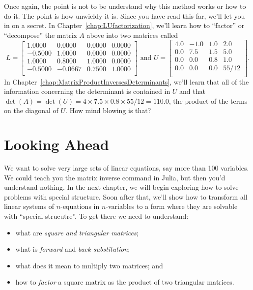 Once again, the point is not to be understand why this method works or how to do it. The point is how unwieldy it is. Since you have read this far, we'll let you in on a secret. In Chapter~\ref{chap:LUfactorization}, we'll learn how to ``factor'' or ``decompose'' the matrix $A$ above into two matrices called
$$ L =
\left[
\begin{array}{rrrr}
1.0000 & 0.0000 & 0.0000 & 0.0000 \\
-0.5000 & 1.0000 & 0.0000 & 0.0000 \\
1.0000 & 0.8000 & 1.0000 & 0.0000 \\
-0.5000 & -0.0667 & 0.7500 & 1.0000 \\
\end{array}
\right] \text{ and } U=\left[
\begin{array}{rrrc}
4.0 & -1.0 & 1.0 & 2.0 \\
0.0 & 7.5 & 1.5 & 5.0 \\
0.0 & 0.0 & 0.8 & 1.0 \\
0.0 & 0.0 & 0.0 & 55/12 \\
\end{array}
\right].
$$
In Chapter~\ref{chap:MatrixProductInversesDeterminants}, we'll learn that all of the information concerning the determinant is contained in $U$ and that $\det(A) = \det(U) = 4 \times 7.5 \times 0.8 \times 55/12 = 110.0$, the product of the terms on the diagonal of $U$. How mind blowing is that?

\section{Looking Ahead}

We want to solve very large sets of linear equations, say more than 100 variables. We could teach you the matrix inverse command in Julia, but then you'd understand nothing. In the next chapter, we will begin exploring how to solve problems with special structure. Soon after that, we'll show how to transform all linear systems of $n$-equations in $n$-variables to a form where they are solvable with ``special strucutre''. To get there we need to understand:
\begin{itemize}
\item what are \textit{square and triangular matrices};
    \item what is \textit{forward} and \textit{back substitution}; 
     \item what does it mean to multiply two matrices; and
    \item how to \textit{factor} a square matrix as the product of two triangular matrices.
\end{itemize}

